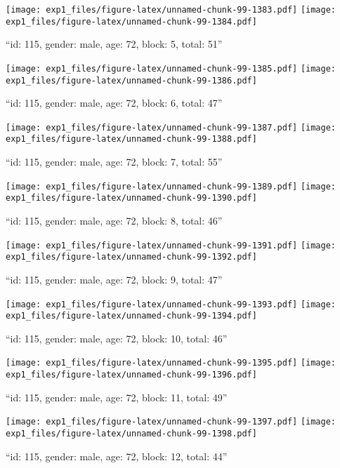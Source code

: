 \documentclass[,]{article}
\begin{document}
\texttt{[image: exp1\_files/figure-latex/unnamed-chunk-99-1383.pdf]}
\texttt{[image: exp1\_files/figure-latex/unnamed-chunk-99-1384.pdf]}

\newpage
[1] 

``id: 115, gender: male, age: 72, block: 5, total: 51''

\texttt{[image: exp1\_files/figure-latex/unnamed-chunk-99-1385.pdf]}
\texttt{[image: exp1\_files/figure-latex/unnamed-chunk-99-1386.pdf]}

\newpage
[1] 

``id: 115, gender: male, age: 72, block: 6, total: 47''

\texttt{[image: exp1\_files/figure-latex/unnamed-chunk-99-1387.pdf]}
\texttt{[image: exp1\_files/figure-latex/unnamed-chunk-99-1388.pdf]}

\newpage
[1] 

``id: 115, gender: male, age: 72, block: 7, total: 55''

\texttt{[image: exp1\_files/figure-latex/unnamed-chunk-99-1389.pdf]}
\texttt{[image: exp1\_files/figure-latex/unnamed-chunk-99-1390.pdf]}

\newpage
[1] 

``id: 115, gender: male, age: 72, block: 8, total: 46''

\texttt{[image: exp1\_files/figure-latex/unnamed-chunk-99-1391.pdf]}
\texttt{[image: exp1\_files/figure-latex/unnamed-chunk-99-1392.pdf]}

\newpage
[1] 

``id: 115, gender: male, age: 72, block: 9, total: 47''

\texttt{[image: exp1\_files/figure-latex/unnamed-chunk-99-1393.pdf]}
\texttt{[image: exp1\_files/figure-latex/unnamed-chunk-99-1394.pdf]}

\newpage
[1] 

``id: 115, gender: male, age: 72, block: 10, total: 46''

\texttt{[image: exp1\_files/figure-latex/unnamed-chunk-99-1395.pdf]}
\texttt{[image: exp1\_files/figure-latex/unnamed-chunk-99-1396.pdf]}

\newpage
[1] 

``id: 115, gender: male, age: 72, block: 11, total: 49''

\texttt{[image: exp1\_files/figure-latex/unnamed-chunk-99-1397.pdf]}
\texttt{[image: exp1\_files/figure-latex/unnamed-chunk-99-1398.pdf]}

\newpage
[1] 

``id: 115, gender: male, age: 72, block: 12, total: 44''
\end{document}
